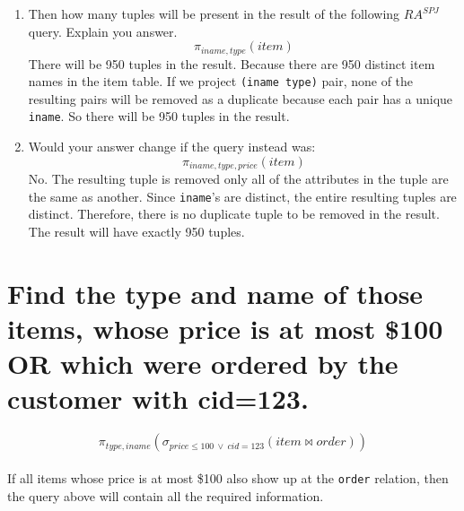 \documentclass{article}
\begin{document}
\begin{enumerate}
\item  Then how many tuples will be present in the result of the following \(RA^{SPJ}\) query. Explain you answer.
\[
\pi_{iname, type}(item)
\]
There will be 950 tuples in the result. Because there are 950 distinct item names in the item table. If we project \texttt{(iname type)} pair, none of the resulting pairs will be removed as a duplicate because each pair has a unique \texttt{iname}. So there will be 950 tuples in the result.

\item Would your answer change if the query instead was:
\[
\pi_{iname, type, price}(item)
\]
No. The resulting tuple is removed only all of the attributes in the tuple are the same as another. Since \texttt{iname}'s are distinct, the entire resulting tuples are distinct. Therefore, there is no duplicate tuple to be removed in the result. The result will have exactly 950 tuples.

\end{enumerate}

\section{Find the type and name of those items, whose price is at most \$100 OR which were ordered
by the customer with cid=123.}


\[
\pi_{type, iname}(\sigma_{price \leq 100 \ \vee \  cid=123}(item \bowtie order))
\]
\\
If all items whose price is at most \$100 also show up at the \texttt{order} relation, then the query above will contain all the required information.
\end{document}
